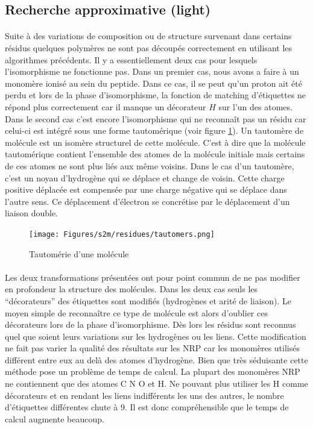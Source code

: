 \documentclass[12pt,french,twoside]{report}
\begin{document}
\subsection{Recherche approximative (light)}

\label{light_p}

\paragraph{}Suite à des variations de composition ou de structure survenant dans certains résidus quelques polymères ne sont pas
découpés correctement en utilisant les algorithmes précédents. Il y a essentiellement deux cas pour lesquels l'isomorphisme
ne fonctionne pas. Dans un premier cas, nous avons a faire à un monomère ionisé au sein du peptide. Dans ce cas, il se peut qu'un
proton ait été perdu et lors de la phase d'isomorphisme, la fonction de matching d'étiquettes ne répond plus correctement car il
manque un décorateur $H$ sur l'un des atomes. Dans le second cas c'est encore l'isomorphisme qui ne reconnaît pas un résidu car
celui-ci est intégré sous une forme tautomérique (voir figure \ref{tautomer}).
Un tautomère de molécule est un isomère structurel de cette molécule.
C'est à dire que la molécule tautomérique contient l'ensemble des atomes de la molécule initiale  mais certains
de ces atomes ne sont plus liés aux même voisins. Dans le cas d'un tautomère, c'est un noyau d'hydrogène qui se déplace et change
de voisin. Cette charge positive déplacée est compensée par une charge négative qui se déplace dans l'autre sens. Ce déplacement
d'électron se concrétise par le déplacement d'un liaison double.

\begin{figure}
  \begin{center}
    \texttt{[image: Figures/s2m/residues/tautomers.png]}
    \caption{\label{tautomer}Tautomérie d'une molécule}
  \end{center}
\end{figure}

\paragraph{}Les deux transformations présentées ont pour point commun de ne pas modifier en profondeur la structure des molécules.
Dans les deux cas seuls les ``décorateurs'' des étiquettes sont modifiés (hydrogènes et arité de liaison).
Le moyen simple de reconnaître ce type de molécule est alors d'oublier ces décorateurs lors de la phase d'isomorphisme.
Dès lors les résidus sont reconnus quel que soient leurs variations sur les hydrogènes ou les liens.
Cette modification ne fait pas varier la qualité des résultats sur les NRP car les monomères utilisés différent entre eux au delà des atomes d'hydrogène.
Bien que très séduisante cette méthode pose un problème de temps de calcul.
La plupart des monomères NRP ne contiennent que des atomes C N O et H.
Ne pouvant plus utiliser les H comme décorateurs et en rendant les liens indifférents les uns des autres, le nombre d'étiquettes différentes chute à 9.
Il est donc compréhensible que le temps de calcul augmente beaucoup.
\end{document}
